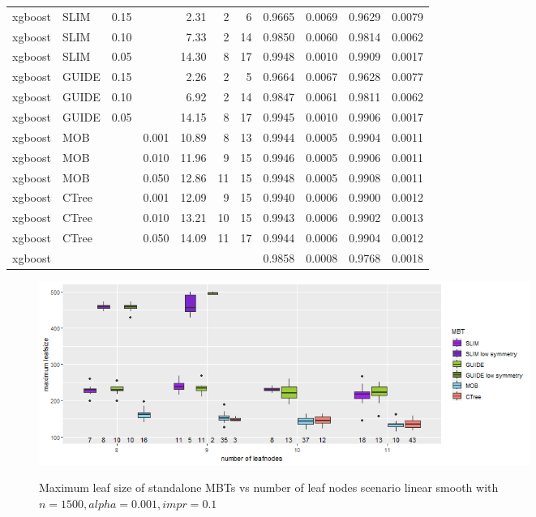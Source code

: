 \begin{table}[!htb]
\begin{tabular}[t]{l|l|r|r|r|r|r|r|r|r|r}
xgboost & SLIM & 0.15 & & 2.31 & 2 & 6 & 0.9665 & 0.0069 & 0.9629 & 0.0079\\
xgboost & SLIM & 0.10 & & 7.33 & 2 & 14 & 0.9850 & 0.0060 & 0.9814 & 0.0062\\
xgboost & SLIM & 0.05 & & 14.30 & 8 & 17 & 0.9948 & 0.0010 & 0.9909 & 0.0017\\
xgboost & GUIDE & 0.15 & & 2.26 & 2 & 5 & 0.9664 & 0.0067 & 0.9628 & 0.0077\\
xgboost & GUIDE & 0.10 & & 6.92 & 2 & 14 & 0.9847 & 0.0061 & 0.9811 & 0.0062\\
xgboost & GUIDE & 0.05 & & 14.15 & 8 & 17 & 0.9945 & 0.0010 & 0.9906 & 0.0017\\
xgboost & MOB & & 0.001 & 10.89 & 8 & 13 & 0.9944 & 0.0005 & 0.9904 & 0.0011\\
xgboost & MOB & & 0.010 & 11.96 & 9 & 15 & 0.9946 & 0.0005 & 0.9906 & 0.0011\\
xgboost & MOB & & 0.050 & 12.86 & 11 & 15 & 0.9948 & 0.0005 & 0.9908 & 0.0011\\
xgboost & CTree & & 0.001 & 12.09 & 9 & 15 & 0.9940 & 0.0006 & 0.9900 & 0.0012\\
xgboost & CTree & & 0.010 & 13.21 & 10 & 15 & 0.9943 & 0.0006 & 0.9902 & 0.0013\\
xgboost & CTree & & 0.050 & 14.09 & 11 & 17 & 0.9944 & 0.0006 & 0.9904 & 0.0012\\
\hline
xgboost &  & & &  &  &  & 0.9858 & 0.0008 & 0.9768 & 0.0018\\
\hline
\end{tabular}
\label{tab:app_linear_smooth_1000}
\end{table}


\begin{figure}[!htb]
\caption{Maximum leaf size of standalone MBTs vs number of leaf nodes scenario linear smooth with $n=1500, alpha = 0.001, impr = 0.1$}
    \includegraphics[width=16cm]{Figures/simulations/batchtools/basic_scenarios/linear_smooth/ls_1000_standalone_symmetrie.png}
    \label{fig:app_ls_1000_standalone_symmetrie}
\end{figure} 


